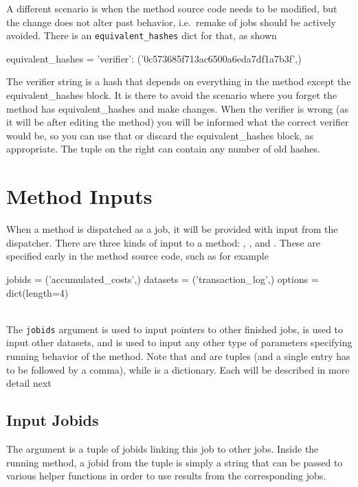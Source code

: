 A different scenario is when the method source code needs to be
modified, but the change does not alter past behavior, i.e.\ remake of
jobs should be actively avoided.  There is an
\texttt{equivalent\_hashes} dict for that, as shown
\\
\begin{python}
  equivalent_hashes = {'verifier': ('0c573685f713ac6500a6eda7df1a7b3f',)}
\end{python}

The verifier string is a hash that depends on everything in the method
except the equivalent\_hashes block. It is there to avoid the scenario
where you forget the method has equivalent\_hashes and make changes. When
the verifier is wrong (as it will be after editing the method) you will be
informed what the correct verifier would be, so you can use that or discard
the equivalent\_hashes block, as appropriate. The tuple on the right can
contain any number of old hashes.



\section{Method Inputs}

When a method is dispatched as a job, it will be provided with input
from the dispatcher.  There are three kinds of input to a method:
\jobids, \datasets, and \options.  These are specified early in the
method source code, such as for example
\\
\begin{python}
jobids = ('accumulated_costs',)
datasets = ('transaction_log',)
options = dict(length=4)
\end{python}
\\
The \texttt{jobids} argument is used to input pointers to other
finished jobs, \datasets is used to input other datasets, and \options
is used to input any other type of parameters specifying running
behavior of the method.  Note that \jobids and \datasets are tuples
(and a single entry has to be followed by a comma), while \options is
a dictionary.  Each will be described in more detail next



\subsection{Input Jobids}
The \jobids argument is a tuple of jobids linking this job to other
jobs.  Inside the running method, a jobid from the \jobids tuple is
simply a string that can be passed to various helper functions in
order to use results from the corresponding jobs.



